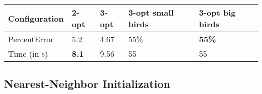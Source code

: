 \begin{table}[h!]
\centering
\begin{tabular}{ |p{2cm}||p{0.75cm}|p{0.75cm}|p{0.75cm}|p{0.75cm}|  }
 \hline
 Configuration& 2-opt & 3-opt & 3-opt small birds & 3-opt big birds\\
 \hline \hline
PercentError & 5.2 & 4.67 & 55\% & \textbf{55\%}\\
 \hline
 Time (in s) & \textbf{8.1} & 9.56 & 55 & 55\\
 \hline
\end{tabular}
\caption{}
\label{3_opt_big_small_performance}
\end{table}

\subsection{Nearest-Neighbor Initialization}
